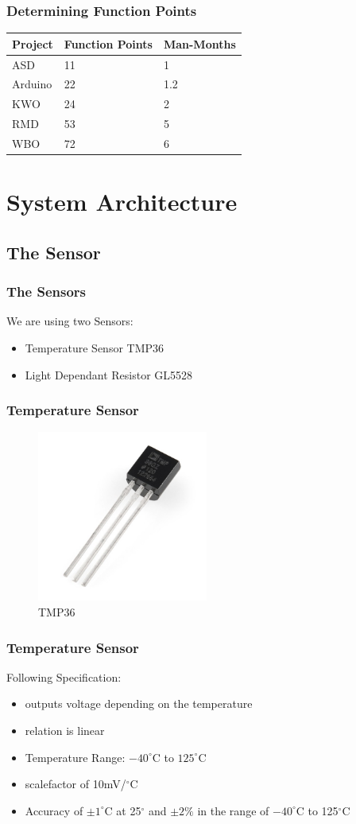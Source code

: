 \documentclass{beamer}
\begin{document}
\frame
{
	\frametitle{Determining Function Points}
	\begin{tabular}{|l|l|l|}
	\hline
	Project & Function Points 	& Man-Months 	\\ \hline
	ASD 	& 11 				& 1				\\ \hline
	Arduino	& 22				& 1.2			\\ \hline
	KWO 	& 24 				& 2				\\ \hline
	RMD 	& 53 				& 5				\\ \hline
	WBO 	& 72 				& 6				\\ \hline
	\end{tabular}
}

\section{System Architecture}
\subsection{The Sensor}
\frame
{
	\frametitle{The Sensors}
	We are using two Sensors:	
	\begin{itemize}
	\item Temperature Sensor TMP36
	\item Light Dependant Resistor GL5528	
	\end{itemize}
}

\frame
{
	\frametitle{Temperature Sensor}
	\begin{figure}[h!]
  		\centering
    	\includegraphics[width=0.5\textwidth]{../Images/Temp.jpg}
		\caption{TMP36}
	\end{figure}
}

\frame
{
	\frametitle{Temperature Sensor}
	Following Specification:
	\begin{itemize}
	\item outputs voltage depending on the temperature
	\item relation is linear
	\item Temperature Range: $-40^{\circ}$C to $125^{\circ}$C
	\item scalefactor of 10mV/$^{\circ}$C
	\item Accuracy of $\pm1^{\circ}$C at 25$^{\circ}$ and $\pm2\%$ in the range of $-40^{\circ}$C to 125$^{\circ}$C
	\end{itemize}
}
\end{document}
